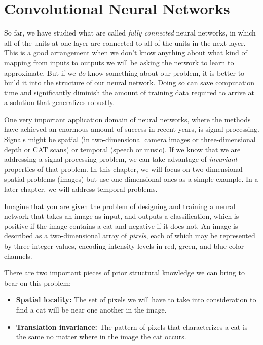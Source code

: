 \chapter{Convolutional Neural Networks}
\label{chap-cnn}

So far, we have studied what are called {\em fully connected} neural
networks, in which all of the units at one layer are connected to all
of the units in the next layer. This is a good arrangement when we
don't know anything about what kind of mapping from inputs to outputs
we will be asking the network to learn to approximate.  But if we {\em
    do} know something about our problem, it is better to build it into
the structure of our neural network.  Doing so can save
computation time and significantly diminish the amount of training
data required to arrive at a solution that generalizes robustly.

One very important application domain of neural networks, where the
methods have achieved an enormous amount of success in recent years,
is signal processing.  Signals might be spatial (in two-dimensional
camera images or three-dimensional depth or CAT scans) or temporal
(speech or music).   If we know that we are addressing a
signal-processing problem, we can take advantage of {\em invariant}
properties of that problem.  In this chapter, we will focus on
two-dimensional spatial problems (images) but use one-dimensional ones
as a simple example.  In a later chapter, we will address temporal problems.

Imagine that you are given the problem of designing and training a
neural network that takes an image as input, and outputs a
classification, which is positive if the image contains a cat and
negative if it does not.  An image is described as a two-dimensional
array of {\em pixels},
each of which may be represented by three integer values, encoding
intensity levels in red, green, and blue color channels.

There are two important pieces of prior structural knowledge
we can bring to bear on this problem:
\begin{itemize}
  \item{\bf Spatial locality:}  The set of pixels we will have to take
  into consideration to find a cat will be near one another in the
  image. 

  \item{\bf Translation invariance:}  The pattern of pixels that
  characterizes a cat is the same no matter where in the image the cat
  occurs. 
\end{itemize}

